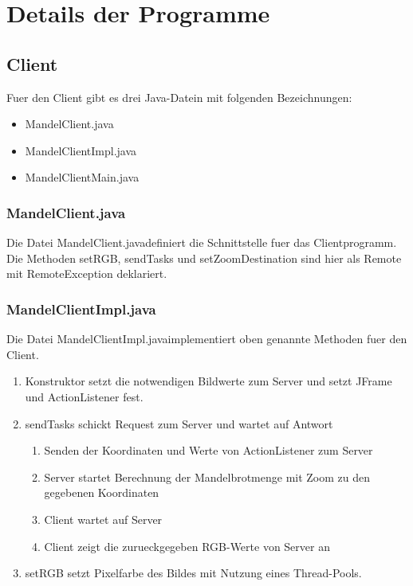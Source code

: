 \documentclass{article}
\begin{document}
\section{Details der Programme}
\subsection{Client}
	Fuer den Client gibt es drei Java-Datein mit folgenden Bezeichnungen:
	\begin{itemize}
		\item MandelClient.java
		\item MandelClientImpl.java
		\item MandelClientMain.java
	\end{itemize}
\subsubsection{MandelClient.java}
	Die Datei \glqq MandelClient.java\grqq definiert die Schnittstelle fuer das Clientprogramm. Die Methoden setRGB, sendTasks und setZoomDestination sind hier als Remote mit RemoteException deklariert.
	

	\newpage
\subsubsection{MandelClientImpl.java}
	Die Datei \glqq MandelClientImpl.java\grqq implementiert oben genannte Methoden fuer den Client.\\

	\begin{enumerate}
		\item Konstruktor setzt die notwendigen Bildwerte zum Server und setzt JFrame und ActionListener fest.\\
			
		\item sendTasks schickt Request zum Server und wartet auf Antwort\\
			\begin{enumerate}
				\item Senden der Koordinaten und Werte von ActionListener zum Server
				\item Server startet Berechnung der Mandelbrotmenge mit Zoom zu den gegebenen Koordinaten
				\item Client wartet auf Server
				\item Client zeigt die zurueckgegeben RGB-Werte von Server an
			\end{enumerate}
			
		\item setRGB setzt Pixelfarbe des Bildes mit Nutzung eines Thread-Pools.
			
	\end{enumerate}
	
\end{document}
